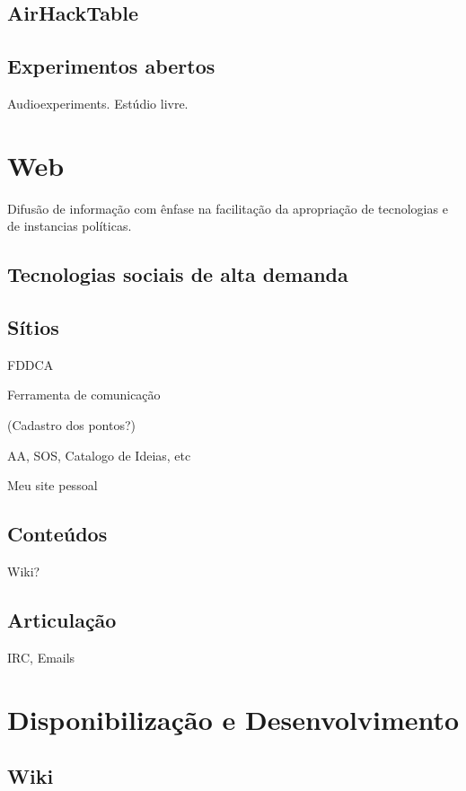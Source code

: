 \subsection{AirHackTable}

\subsection{Experimentos abertos}

Audioexperiments. Estúdio livre.

\section{Web}

Difusão de informação com ênfase na facilitação
da apropriação de tecnologias e de instancias políticas.

\subsection{Tecnologias sociais de alta demanda}

\subsection{Sítios}

FDDCA

Ferramenta de comunicação

(Cadastro dos pontos?)

AA, SOS, Catalogo de Ideias, etc

Meu site pessoal


\subsection{Conteúdos}

Wiki?

\subsection{Articulação}

IRC, Emails

\section{Disponibilização e Desenvolvimento}

\subsection{Wiki}

